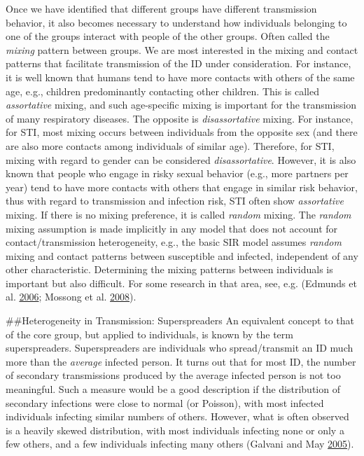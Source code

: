 \documentclass[]{book}
\theoremstyle{definition}
\theoremstyle{definition}
\theoremstyle{definition}
\theoremstyle{remark}
\begin{document}
Once we have identified that different groups have different
transmission behavior, it also becomes necessary to understand how
individuals belonging to one of the groups interact with people of the
other groups. Often called the \emph{mixing} pattern between groups. We
are most interested in the mixing and contact patterns that facilitate
transmission of the ID under consideration. For instance, it is well
known that humans tend to have more contacts with others of the same
age, e.g., children predominantly contacting other children. This is
called \emph{assortative} mixing, and such age-specific mixing is
important for the transmission of many respiratory diseases. The
opposite is \emph{disassortative} mixing. For instance, for STI, most
mixing occurs between individuals from the opposite sex (and there are
also more contacts among individuals of similar age). Therefore, for
STI, mixing with regard to gender can be considered
\emph{disassortative}. However, it is also known that people who engage
in risky sexual behavior (e.g., more partners per year) tend to have
more contacts with others that engage in similar risk behavior, thus
with regard to transmission and infection risk, STI often show
\emph{assortative} mixing. If there is no mixing preference, it is
called \emph{random} mixing. The \emph{random} mixing assumption is made
implicitly in any model that does not account for contact/transmission
heterogeneity, e.g., the basic SIR model assumes \emph{random} mixing
and contact patterns between susceptible and infected, independent of
any other characteristic. Determining the mixing patterns between
individuals is important but also difficult. For some research in that
area, see, e.g. (Edmunds et al. \protect\hyperlink{ref-edmunds06}{2006};
Mossong et al. \protect\hyperlink{ref-mossong08}{2008}).

\#\#Heterogeneity in Transmission: Superspreaders An equivalent concept
to that of the core group, but applied to individuals, is known by the
term superspreaders. Superspreaders are individuals who spread/transmit
an ID much more than the \emph{average} infected person. It turns out
that for most ID, the number of secondary transmissions produced by the
average infected person is not too meaningful. Such a measure would be a
good description if the distribution of secondary infections were close
to normal (or Poisson), with most infected individuals infecting similar
numbers of others. However, what is often observed is a heavily skewed
distribution, with most individuals infecting none or only a few others,
and a few individuals infecting many others (Galvani and May
\protect\hyperlink{ref-galvani05}{2005}).
\end{document}
